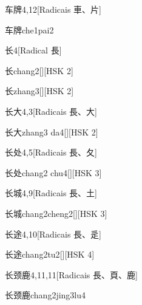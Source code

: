 \begin{entry}{车牌}{4,12}[Radicais ⾞、⽚]
  \begin{phonetics}{车牌}{che1pai2}
  \end{phonetics}
\end{entry}

\begin{entry}{长}{4}[Radical ⾧]
  \begin{phonetics}{长}{chang2}[][HSK 2]
  \end{phonetics}
  \begin{phonetics}{长}{zhang3}[][HSK 2]
  \end{phonetics}
\end{entry}

\begin{entry}{长大}{4,3}[Radicais ⾧、⼤]
  \begin{phonetics}{长大}{zhang3 da4}[][HSK 2]
  \end{phonetics}
\end{entry}

\begin{entry}{长处}{4,5}[Radicais ⾧、⼡]
  \begin{phonetics}{长处}{chang2 chu4}[][HSK 3]
  \end{phonetics}
\end{entry}

\begin{entry}{长城}{4,9}[Radicais ⾧、⼟]
  \begin{phonetics}{长城}{chang2cheng2}[][HSK 3]
  \end{phonetics}
\end{entry}

\begin{entry}{长途}{4,10}[Radicais ⾧、⾡]
  \begin{phonetics}{长途}{chang2tu2}[][HSK 4]
  \end{phonetics}
\end{entry}

\begin{entry}{长颈鹿}{4,11,11}[Radicais ⾧、⾴、⿅]
  \begin{phonetics}{长颈鹿}{chang2jing3lu4}
  \end{phonetics}
\end{entry}

